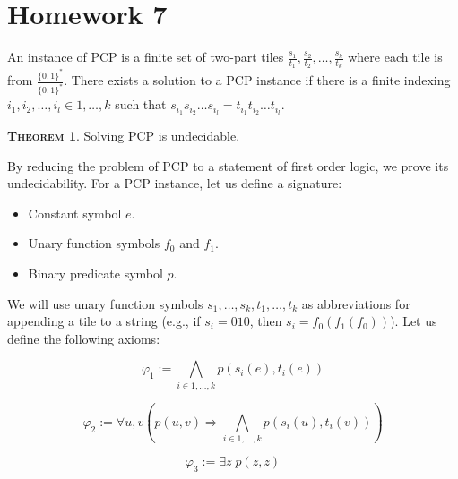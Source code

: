 \documentclass{article}
\theoremstyle{definition}
\newtheorem{theorem}[definition]{\scshape Theorem}
\begin{document}

\section*{Homework 7}

An instance of PCP is a finite set of two-part tiles $\frac {s_1} {t_1}, \frac {s_2} {t_2}, \ldots, \frac {s_k} {t_k}$ where each tile is from $\frac {\{0, 1\}^*}{\{0, 1\}^*}$. There exists a solution to a PCP instance if there is a finite indexing $i_1, i_2, \ldots, i_l \in 1, \ldots, k$ such that $s_{i_1}s_{i_2}\ldots s_{i_l} = t_{i_1}t_{i_2}\ldots t_{i_l} $.

\begin{theorem}
    Solving PCP is undecidable.
\end{theorem}

By reducing the problem of PCP to a statement of first order logic, we prove its undecidability. For a PCP instance, let us define a signature:
\begin{itemize}
    \item Constant symbol $e$.
    \item Unary function symbols $f_0$ and $f_1$.
    \item Binary predicate symbol $p$.
\end{itemize}

We will use unary function symbols $s_1, \ldots, s_k, t_1, \ldots, t_k$ as abbreviations for appending a tile to a string (e.g., if $s_i = 010$, then $s_i = f_0(f_1(f_0))$).
Let us define the following axioms:

$$\varphi_1 := \bigwedge_{i \in 1, \ldots, k} p(s_i(e), t_i(e))$$

$$\varphi_2 := \forall u, v \left(p(u, v) \Rightarrow \bigwedge_{i \in 1, \ldots, k} p(s_i(u), t_i(v))\right)$$

$$\varphi_3 := \exists z \; p(z, z)$$
\end{document}
